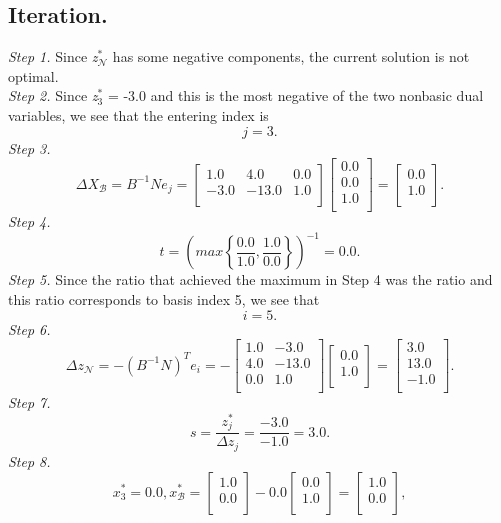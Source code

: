 \documentclass [12pt] {article}
\begin{document}
\subsection{  Iteration.}
\textit{Step 1. } Since \textit{z}$^*_{\mathcal N}$ has some negative components, the current solution is not optimal.\\
\textit{Step 2. } Since \textit{z}$^*_3$ = -3.0 and this is the most negative of the two nonbasic dual variables, we see that the entering index is
\[
j = 3.
\]
\textit{Step 3. }
\[
\Delta X_{\mathcal B} = B^{-1} N e_j = \begin{bmatrix} 1.0 & 4.0 & 0.0 \\ -3.0 & -13.0 & 1.0 \\ \end{bmatrix}
\begin{bmatrix} 0.0 \\ 0.0 \\ 1.0 \\ \end{bmatrix}
= \begin{bmatrix} 0.0 \\ 1.0 \\ \end{bmatrix}
.
\]
\textit{Step 4. }
\[
t = \left ( max \left \{ \frac{0.0}{1.0} , \frac{1.0}{0.0} \right \} \right )^{-1}   = 0.0.
\]\textit{Step 5.} Since the ratio that achieved the maximum in Step 4 was the  ratio and this ratio corresponds to basis index 5, we see that
\[
i = 5.
\]
\textit{Step 6. } 
\[
\Delta z_{\mathcal N} = -\left (B^{-1} N \right )^T e_i = - \begin{bmatrix} 1.0 & -3.0 \\ 4.0 & -13.0 \\ 0.0 & 1.0 \\ \end{bmatrix}
\begin{bmatrix} 0.0 \\ 1.0 \\ \end{bmatrix}
= \begin{bmatrix} 3.0 \\ 13.0 \\ -1.0 \\ \end{bmatrix}.
\]
\textit{Step 7. } 
\[
s =  \frac{z^*_j}{\Delta z_j} = \frac{ -3.0 }{ -1.0 } = 3.0.
\]
\textit{Step 8.}
\[
x^*_3 = 0.0,        x^*_{\mathcal B} = 
\begin{bmatrix} 1.0 \\ 0.0 \\ \end{bmatrix} - 0.0 \begin{bmatrix} 0.0 \\ 1.0 \\ \end{bmatrix} = \begin{bmatrix} 1.0 \\ 0.0 \\ \end{bmatrix} ,
\]
\end{document}
